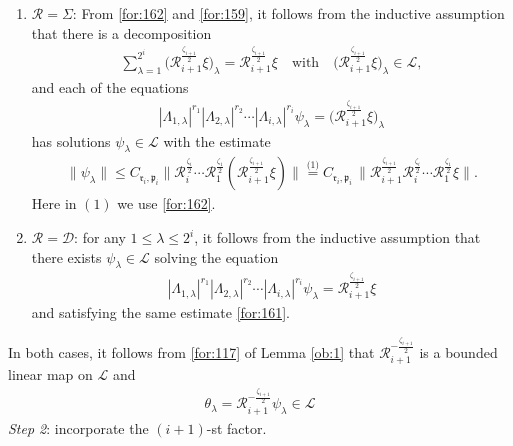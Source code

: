 \documentclass[11 pt]{amsart}
\newcommand{\norm}[1]{\lVert#1\rVert}
\theoremstyle{definition}
\numberwithin{equation}{section}
\begin{document}
\begin{enumerate}
  \item $\mathcal{R}=\Sigma$: From \eqref{for:162} and \eqref{for:159}, it follows from the inductive assumption that there is a decomposition
\begin{align*}
 \sum_{\lambda=1}^{2^i}\big(\mathcal{R}_{i+1}^{\frac{\zeta_{i+1}}{2}}\xi\big)_\lambda=\mathcal{R}_{i+1}^{\frac{\zeta_{i+1}}{2}}\xi\quad\text{with}\quad \big(\mathcal{R}_{i+1}^{\frac{\zeta_{i+1}}{2}}\xi\big)_\lambda\in\mathcal{L},
\end{align*}
 and each of the equations
\begin{align}\label{for:160}
   |\Lambda_{1,\lambda}|^{r_1}|\Lambda_{2,\lambda}|^{r_2}\cdots |\Lambda_{i,\lambda}|^{r_i}\psi_\lambda=\big(\mathcal{R}_{i+1}^{\frac{\zeta_{i+1}}{2}}\xi\big)_\lambda
\end{align}
  has solutions $\psi_\lambda\in \mathcal{L}$ with the estimate
  \begin{align}\label{for:161}
 \norm{\psi_\lambda}\leq C_{\mathfrak{r}_i,\mathfrak{p}_i} \big\|\mathcal{R}_i^{\frac{\zeta_i}{2}}\cdots\mathcal{R}_1^{\frac{\zeta_1}{2}}(\mathcal{R}_{i+1}^{\frac{\zeta_{i+1}}{2}}\xi)\big\|
 \overset{\text{(1)}}{=}
     C_{\mathfrak{r}_{i},\mathfrak{p}_{i}}\,
     \big\|\mathcal{R}_{i+1}^{\frac{\zeta_{i+1}}{2}}\mathcal{R}_i^{\frac{\zeta_i}{2}}\cdots\mathcal{R}_1^{\frac{\zeta_1}{2}}\xi\big\|.
\end{align}
Here in $(1)$ we use \eqref{for:162}.
  \item $\mathcal{R}=\mathcal{D}$: for any $1\le\lambda\le 2^i$, it follows from the inductive assumption that there exists
        $\psi_\lambda\in\mathcal L$ solving the equation
\begin{align}\label{for:279}
   |\Lambda_{1,\lambda}|^{r_1}|\Lambda_{2,\lambda}|^{r_2}\cdots |\Lambda_{i,\lambda}|^{r_i}\psi_\lambda=\mathcal{R}_{i+1}^{\frac{\zeta_{i+1}}{2}}\xi
\end{align}
 and satisfying the same estimate \eqref{for:161}.
\end{enumerate}
In both cases, it follows from \eqref{for:117} of Lemma \ref{ob:1} that $\mathcal{R}_{i+1}^{-\frac{\zeta_{i+1}}{2}}$ is a bounded linear map on $\mathcal{L}$ and
\begin{align}\label{for:149}
  \theta_\lambda=\mathcal{R}_{i+1}^{-\frac{\zeta_{i+1}}{2}}\psi_\lambda \in \mathcal{L}
\end{align}
\emph{Step 2}: incorporate the $(i+1)$-st factor.
\end{document}
